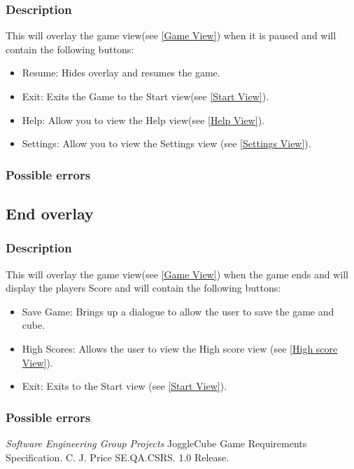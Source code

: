 \documentclass{project}
\begin{document}
\subsubsection{Description}
This will overlay the game view(see \ref{Game View}) when it is paused and will contain the following buttons:
\begin{itemize}
\item[]Resume: Hides overlay and resumes the game.
\item[]Exit: Exits the Game to the Start view(see \ref{Start View}).
\item[]Help: Allow you to view the Help view(see \ref{Help View}).
\item[]Settings: Allow you to view the Settings view (see \ref{Settings View}).
\end{itemize}
\subsubsection{Possible errors}


\subsection{End overlay} \label{End Overlay}
\subsubsection{Description}
This will overlay the game view(see \ref{Game View}) when the game ends and will display the players Score and will contain the following buttons:
\begin{itemize}
\item[]Save Game: Brings up a dialogue to allow the user to save the game and cube.
\item[]High Scores: Allows the user to view the High score view (see \ref{High score View}).
\item[]Exit: Exits to the Start view (see \ref{Start View}).
\end{itemize}
\subsubsection{Possible errors}


\clearpage
{}
\begin{thebibliography}{5}
 \emph{Software Engineering Group Projects}
JoggleCube Game Requirements Specification.
C. J. Price SE.QA.CSRS. 1.0 Release.
\end{thebibliography}
\clearpage
{}
\end{document}
